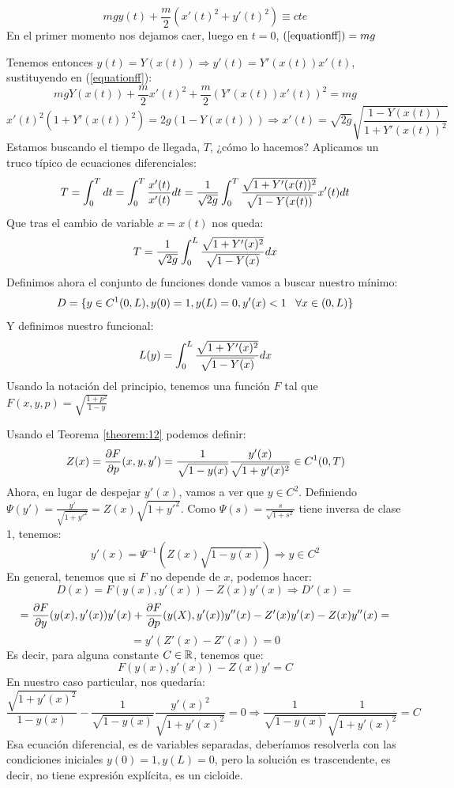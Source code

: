 \begin{equation}
\label{equationff}
mgy(t)+\frac{m}{2}(x'(t)^2+y'(t)^2)\equiv cte
\end{equation}
En el primer momento nos dejamos caer, luego en $t=0$, $(\ref{equationff})=mg$

Tenemos entonces $y(t)=Y(x(t)) \Rightarrow y'(t)=Y'(x(t))x'(t)$, sustituyendo en (\ref{equationff}):
\[
mgY(x(t))+\frac{m}{2}x'(t)^2+\frac{m}{2}(Y'(x(t))x'(t))^2=mg
\]
\[
x'(t)^2\left(1+Y'(x(t))^2\right)=2g\left(1-Y(x(t))\right)\Rightarrow x'(t)=\sqrt{2g}\sqrt{\frac{1-Y(x(t))}{1+Y'(x(t))^2}}
\]
Estamos buscando el tiempo de llegada, $T$, ¿cómo lo hacemos? Aplicamos un truco típico de ecuaciones diferenciales:
\[
T = \displaystyle\int_{ 0 }^{ T } dt=\displaystyle\int_{ 0 }^{ T } \frac{x'(t)}{x'(t)}dt=
\frac{1}{\sqrt{2g}}\displaystyle\int_{ 0 }^{ T } \frac{\sqrt{1+Y'(x(t))^2}}{\sqrt{1-Y(x(t))}}x'(t)dt
\]
Que tras el cambio de variable $x=x(t)$ nos queda:
\[
T=\frac{1}{\sqrt{2g}}\displaystyle\int_{ 0 }^{ L } \frac{\sqrt{1+Y'(x)^2}}{\sqrt{1-Y(x)}}dx
\]
Definimos ahora el conjunto de funciones donde vamos a buscar nuestro mínimo:
\[
D=\{y\in C^1(0,L),y(0)=1,y(L)=0, y'(x)<1 \;\;\; \forall x \in(0,L)\}
\]
Y definimos nuestro funcional:
\[
L(y)=\displaystyle\int_{ 0 }^{ L } \frac{\sqrt{1+Y'(x)^2}}{\sqrt{1-Y(x)}}dx
\]
Usando la notación del principio, tenemos una función $F$ tal que $F(x,y,p)=\sqrt{\frac{1+p^2}{1-y}}$

Usando el Teorema \ref{theorem:12} podemos definir:
\[
Z(x)=\frac{\partial F }{\partial p }(x,y,y')=\frac{1}{\sqrt{1-y(x)}}\frac{y'(x)}{\sqrt{1+y'(x)^2}} \in C^1(0,T)
\]
Ahora, en lugar de despejar $y'(x)$, vamos a ver que $y\in C^2$. Definiendo $\Psi(y')=\frac{y'}{\sqrt{1+y'^2}}=Z(x)\sqrt{1+y'^2}$. Como $\Psi(s)=\frac{s}{\sqrt{1+s^2}}$ tiene inversa de clase 1, tenemos:
\[
y'(x)=\Psi^{-1}(Z(x)\sqrt{1-y(x)})\Rightarrow y\in C^2
\]
En general, tenemos que si $F$ no depende de $x$, podemos hacer:
\[D(x)=F(y(x),y'(x))-Z(x)y'(x)\Rightarrow D'(x)=
\]
\[=\frac{\partial F }{\partial y }(y(x),y'(x))y'(x)+\frac{\partial F }{\partial p }(y(X),y'(x))y''(x)-Z'(x)y'(x)-Z(x)y''(x)=\]
\[
=y'(Z'(x)-Z'(x))=0
\]
Es decir, para alguna constante $C\in\mathbb{R}$, tenemos que:
\[
F(y(x),y'(x))-Z(x)y'=C
\]
En nuestro caso particular, nos quedaría:
\[
\frac{\sqrt{1+y'(x)^2}}{1-y(x)}-\frac{1}{\sqrt{1-y(x)}}\frac{y'(x)^2}{\sqrt{1+y'(x)^2}}=0 \Rightarrow \frac{1}{\sqrt{1-y(x)}}\frac{1}{\sqrt{1+y'(x)^2}}=C
\]
Esa ecuación diferencial, es de variables separadas, deberíamos resolverla con las condiciones iniciales $y(0)=1,y(L)=0$, pero la solución es trascendente, es decir, no tiene expresión explícita, es un cicloide.

